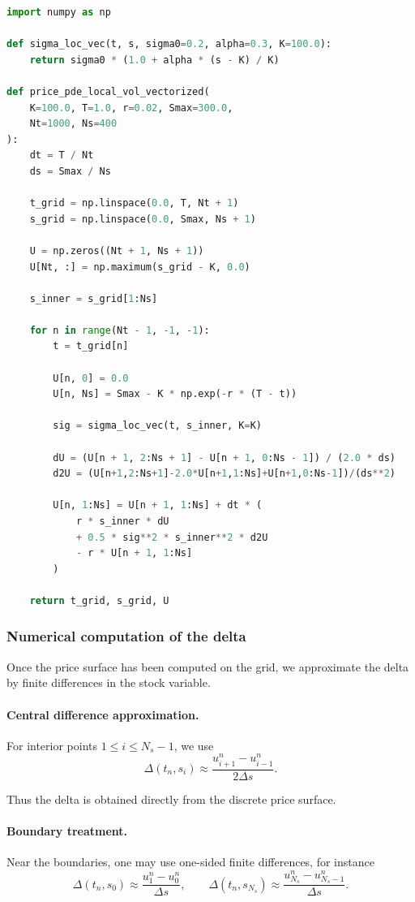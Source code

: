 \documentclass[11pt]{article}
\theoremstyle{plain}
\theoremstyle{definition}
\theoremstyle{remark}
\begin{document}
\begin{lstlisting}[language=Python]
import numpy as np

def sigma_loc_vec(t, s, sigma0=0.2, alpha=0.3, K=100.0):
    return sigma0 * (1.0 + alpha * (s - K) / K)

def price_pde_local_vol_vectorized(
    K=100.0, T=1.0, r=0.02, Smax=300.0,
    Nt=1000, Ns=400
):
    dt = T / Nt
    ds = Smax / Ns

    t_grid = np.linspace(0.0, T, Nt + 1)
    s_grid = np.linspace(0.0, Smax, Ns + 1)

    U = np.zeros((Nt + 1, Ns + 1))
    U[Nt, :] = np.maximum(s_grid - K, 0.0)

    s_inner = s_grid[1:Ns]

    for n in range(Nt - 1, -1, -1):
        t = t_grid[n]

        U[n, 0] = 0.0
        U[n, Ns] = Smax - K * np.exp(-r * (T - t))

        sig = sigma_loc_vec(t, s_inner, K=K)

        dU = (U[n + 1, 2:Ns + 1] - U[n + 1, 0:Ns - 1]) / (2.0 * ds)
        d2U = (U[n+1,2:Ns+1]-2.0*U[n+1,1:Ns]+U[n+1,0:Ns-1])/(ds**2)

        U[n, 1:Ns] = U[n + 1, 1:Ns] + dt * (
            r * s_inner * dU
            + 0.5 * sig**2 * s_inner**2 * d2U
            - r * U[n + 1, 1:Ns]
        )

    return t_grid, s_grid, U
\end{lstlisting}

\subsubsection{Numerical computation of the delta}

Once the price surface has been computed on the grid, we approximate the
delta by finite differences in the stock variable.

\paragraph{Central difference approximation.}
For interior points \(1\le i\le N_s-1\), we use
\[
\Delta(t_n,s_i)
\approx
\frac{u_{i+1}^n-u_{i-1}^n}{2\Delta s}.
\]

Thus the delta is obtained directly from the discrete price surface.

\paragraph{Boundary treatment.}
Near the boundaries, one may use one-sided finite differences, for
instance
\[
\Delta(t_n,s_0)
\approx
\frac{u_1^n-u_0^n}{\Delta s},
\qquad
\Delta(t_n,s_{N_s})
\approx
\frac{u_{N_s}^n-u_{N_s-1}^n}{\Delta s}.
\]
\end{document}
